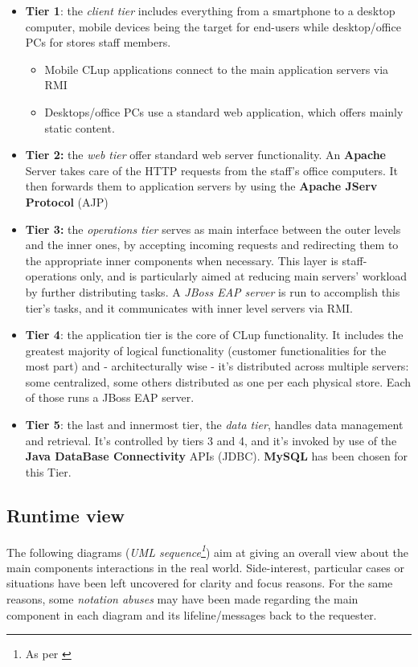 \begin{itemize}
    \item \textbf{Tier 1}: the \textit{client tier} includes everything from a smartphone to a desktop computer, mobile devices being the target for end-users while desktop/office PCs for stores staff members. 
    \begin{itemize}
        \item Mobile CLup applications connect to the main application servers via RMI
        \item Desktops/office PCs use a standard web application, which offers mainly static content.
    \end{itemize}
    \item \textbf{Tier 2:} the \textit{web tier} offer standard web server functionality. An \textbf{Apache} Server takes care of the HTTP requests from the staff's office computers. It then forwards them to application servers by using the \textbf{Apache JServ Protocol} (AJP)
    \item \textbf{Tier 3:} the \textit{operations tier} serves as main interface between the outer levels and the inner ones, by accepting incoming requests and redirecting them to the appropriate inner components when necessary. This layer is staff-operations only, and is particularly aimed at reducing main servers' workload by further distributing tasks. A \textit{JBoss EAP server} is run to accomplish this tier's tasks, and it communicates with inner level servers via RMI.
    \item \textbf{Tier 4}: the application tier is the core of CLup functionality. It includes the greatest majority of logical functionality (customer functionalities for the most part) and - architecturally wise - it's distributed across multiple servers: some centralized, some others distributed as one per each physical store. Each of those runs a JBoss EAP server. 
    \item \textbf{Tier 5}: the last and innermost tier, the \textit{data tier}, handles data management and retrieval. It's controlled by tiers 3 and 4, and it's invoked by use of the \textbf{Java DataBase Connectivity} APIs (JDBC). \textbf{MySQL} has been chosen for this Tier.

\end{itemize}

\subsection{Runtime view}
The following diagrams (\textit{UML sequence\footnote{As per \cite{UML:ref}}}) aim at giving an overall view about the main components interactions in the real world. Side-interest, particular cases or situations have been left uncovered for clarity and focus reasons. For the same reasons, some \textit{notation abuses} may have been made regarding the main component in each diagram and its lifeline/messages back to the requester.\newline


